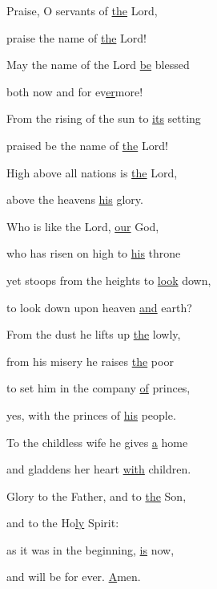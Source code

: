 \noindent Praise, O servants of \uline{the} Lord,~\GreStar{}~\nopagebreak

praise the name of \uline{the} Lord!

\noindent May the name of the Lord \uline{be} blessed~\GreStar{}~\nopagebreak

both now and for ev\uline{er}more!

\noindent From the rising of the sun to \uline{its} setting~\GreStar{}~\nopagebreak

praised be the name of \uline{the} Lord!

\noindent High above all nations is \uline{the} Lord,~\GreStar{}~\nopagebreak

above the heavens \uline{his} glory.

\noindent Who is like the Lord, \uline{our} God,~\GreStar{}~\nopagebreak

who has risen on high to \uline{his} throne

\noindent yet stoops from the heights to \uline{look} down,~\GreStar{}~\nopagebreak

to look down upon heaven \uline{and} earth?

\noindent From the dust he lifts up \uline{the} lowly,~\GreStar{}~\nopagebreak

from his misery he raises \uline{the} poor

\noindent to set him in the company \uline{of} princes,~\GreStar{}~\nopagebreak

yes, with the princes of \uline{his} people.

\noindent To the childless wife he gives \uline{a} home~\GreStar{}~\nopagebreak

and gladdens her heart \uline{with} children.

\noindent Glory to the Father, and to \uline{the} Son,~\GreStar{}~\nopagebreak

and to the Ho\uline{ly} Spirit:

\noindent as it was in the beginning, \uline{is} now,~\GreStar{}~\nopagebreak

and will be for ever. \uline{A}men.

